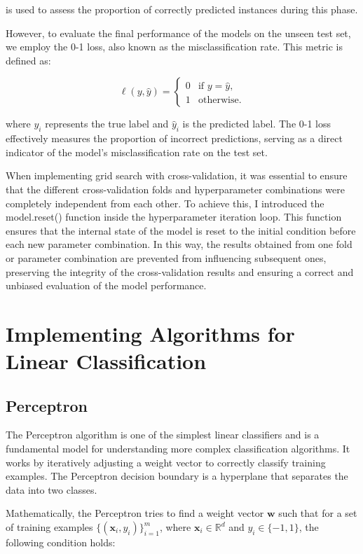 \documentclass[a4paper, 10pt]{article}
\begin{document}
is used to assess the proportion of correctly predicted instances during this phase.

However, to evaluate the final performance of the models on the unseen test set, we employ the 0-1 loss, also known as the misclassification rate. This metric is defined as:

\[
\ell(y, \hat{y}) = 
\begin{cases} 
0 & \text{if } y = \hat{y}, \\
1 & \text{otherwise}.
\end{cases}
\]

where \(y_i\) represents the true label and \(\hat{y}_i\) is the predicted label. The 0-1 loss effectively measures the proportion of incorrect predictions, serving as a direct indicator of the model's misclassification rate on the test set.

When implementing grid search with cross-validation, it was essential to ensure that the different cross-validation folds and hyperparameter combinations were completely independent from each other. To achieve this, I introduced the model.reset() function inside the hyperparameter iteration loop. This function ensures that the internal state of the model is reset to the initial condition before each new parameter combination. In this way, the results obtained from one fold or parameter combination are prevented from influencing subsequent ones, preserving the integrity of the cross-validation results and ensuring a correct and unbiased evaluation of the model performance.

\newpage
\section{Implementing Algorithms for Linear Classification}

\subsection{Perceptron}

The Perceptron algorithm is one of the simplest linear classifiers and is a fundamental model for understanding more complex classification algorithms. It works by iteratively adjusting a weight vector to correctly classify training examples. The Perceptron decision boundary is a hyperplane that separates the data into two classes. \par

Mathematically, the Perceptron tries to find a weight vector \(\mathbf{w}\) such that for a set of training examples \(\{(\mathbf{x}_i, y_i)\}_{i=1}^m\), where \(\mathbf{x}_i \in \mathbb{R}^d\) and \(y_i \in \{-1, 1\}\), the following condition holds:
\end{document}
